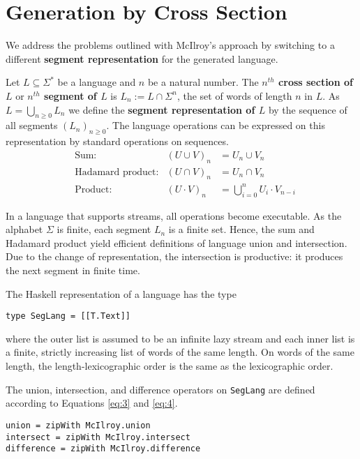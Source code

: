 \section{Generation by Cross Section}
\label{sec:gener-cross-sect}

We address the problems outlined with McIlroy's approach by switching to a
different \textbf{segment representation} for the generated language.

Let $L\subseteq\Sigma^*$ be a language and $n$ be a natural
number. The \textbf{$n^{th}$ cross section of $L$} or
\textbf{$n^{th}$ segment of $L$} is $L_n := L \cap \Sigma^n$, the set of
words of length $n$ in $L$. As $L = \bigcup_{n\ge0} L_n$ we
define the \textbf{segment representation of $L$} by the
sequence of all segments $(L_n)_{n\ge0}$.
The language operations can be expressed on this representation by
standard operations on sequences.
\begin{align}
  \label{eq:3}
  &\text{Sum:}
  & (U \cup V)_n &= U_n \cup V_n \\
  \label{eq:4}
  &\text{Hadamard product:}
  & (U \cap V)_n &= U_n \cap V_n \\
  \label{eq:1}
  &\text{Product:}
  & (U \cdot V)_n &= \bigcup_{i=0}^n U_i\cdot V_{n-i}
\end{align}

In a language that supports streams, all operations become executable.
%
As the alphabet $\Sigma$ is finite, each segment $L_n$ is a finite set. Hence, the sum and
Hadamard product yield efficient definitions of language union and intersection. Due to
the change of representation, the intersection is productive: it produces the next segment
in finite time.

The Haskell representation of a language has the type
\begin{lstlisting}[numbers=none]
type SegLang = [[T.Text]]
\end{lstlisting}
where the outer list is assumed to be an infinite lazy stream and each inner list is
a finite, strictly increasing list of words of the same length. On
words of the same length, the length-lexicographic order is the same
as the lexicographic order.

The union, intersection, and difference operators on
\lstinline{SegLang} are defined according to Equations \eqref{eq:3} and
\eqref{eq:4}.
\begin{lstlisting}[numbers=none]
union = zipWith McIlroy.union
intersect = zipWith McIlroy.intersect
difference = zipWith McIlroy.difference
\end{lstlisting}

